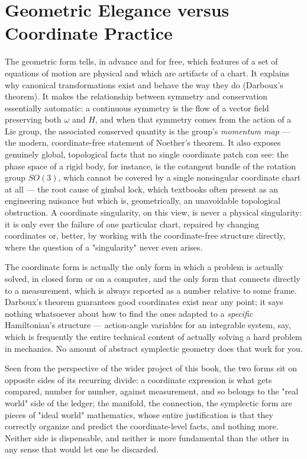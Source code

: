 \section[Geometry vs Coordinates]{Geometric Elegance versus Coordinate Practice }
\label{sec:cm-geom-vs-coord}
The geometric form tells, in advance and for
free, which features of a set of equations of motion are physical
and which are artifacts of a chart. It explains why canonical
transformations exist and behave the way they do (Darboux's
theorem). It makes the relationship between symmetry and conservation
essentially automatic: a continuous symmetry is the flow of a vector
field preserving both $\omega$ and $H$, and when that symmetry comes
from the action of a Lie group, the associated conserved quantity is
the group's \emph{momentum map} --- the modern, coordinate-free
statement of Noether's theorem.
It also exposes genuinely global, topological facts that no single
coordinate patch can see: the phase space of a rigid body, for
instance, is the cotangent bundle of the rotation group $SO(3)$,
which cannot be covered by a single nonsingular coordinate chart at
all --- the root cause of gimbal lock, which textbooks often present
as an engineering nuisance but which is, geometrically, an
unavoidable topological obstruction. A coordinate singularity, on
this view, is never a physical singularity: it is only ever the
failure of one particular chart, repaired by changing coordinates or,
better, by working with the coordinate-free structure directly, where
the question of a "singularity" never even arises.

The coordinate form is actually the only form in which a
problem is actually solved, in closed form or on a computer, and the
only form that connects directly to a measurement, which is always
reported as a number relative to some frame. Darboux's theorem
guarantees good coordinates exist near any point; it says nothing
whatsoever about how to find the ones adapted to a \emph{specific}
Hamiltonian's structure --- action-angle variables for an integrable
system, say, which is frequently the entire technical content of
actually solving a hard problem in mechanics. No amount of abstract
symplectic geometry does that work for you.

Seen from the perspective of the wider project of this book, the two
forms sit on opposite sides of its recurring divide: a coordinate
expression is what gets compared, number for number, against
measurement, and so belongs to the "real world" side of the ledger;
the manifold, the connection, the symplectic form are pieces of
"ideal world" mathematics, whose entire justification is that they
correctly organize and predict the coordinate-level facts, and
nothing more. Neither side is dispensable, and neither is more
fundamental than the other in any sense that would let one be
discarded.

